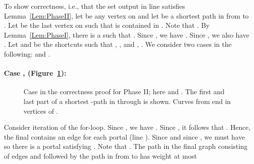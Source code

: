 \documentclass[11pt]{article}
\begin{document}
To show correctness, i.e., that the set output in line  satisfies Lemma~\ref{Lem:PhaseII}, let  be any vertex on  and let  be a shortest path in  from  to . Let  be the last vertex on  such that  is contained in . Note that . By Lemma~\ref{Lem:PhaseI}, there is a  such that . Since , we have . Since , we also have . Let  and  be the shortcuts such that , , and , . We consider two cases in the following:  and .

\paragraph{Case ,  (Figure~\ref{fig:Case1}):}\begin{figure}\centerline{}
\caption{Case  in the correctness proof for Phase II; here  and . The first and last part of a shortest -path in  through  is shown. Curves from  end in vertices of .}
\label{fig:Case1}
\end{figure}
Consider iteration  of the for-loop. Since , we have . Since , it follows that . Hence, the final  contains an edge  for each portal  (line ). Since  and since , we must have  so there is a portal  satisfying . Note that . The path in the final graph  consisting of edges  and  followed by the path in  from  to  has weight at most
\end{document}

